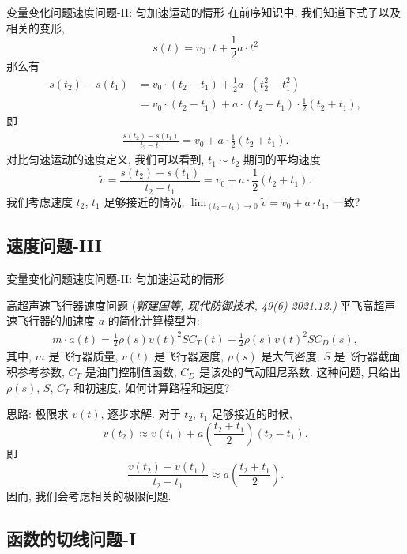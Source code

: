 \documentclass[
10pt,
aspectratio=43,
]{beamer}
\begin{document}
\begin{frame}{变量变化问题}{速度问题-II: 匀加速运动的情形}
	在前序知识中, 我们知道下式子以及相关的变形,
	\[
		s(t) = v_0\cdot t+ \frac{1}{2}a\cdot t^2
	\]
	那么有
	\begin{align*}
		s(t_2) - s(t_1) & = v_0\cdot (t_2-t_1)+ \frac{1}{2}a\cdot (t_2^2-t_1^2)            \\
		                & =v_0\cdot(t_2-t_1) + a\cdot(t_2-t_1) \cdot \frac{1}{2}(t_2+t_1),
	\end{align*}
	即
	\begin{align*}
		\frac{s(t_2) - s(t_1)}{t_2-t_1} = v_0 + a\cdot \frac{1}{2}(t_2+t_1).
	\end{align*}
	对比匀速运动的速度定义, 我们可以看到, $t_1\sim t_2$ 期间的平均速度
	\begin{equation*}
		\tilde{v}=\frac{s(t_2) - s(t_1)}{t_2-t_1} = v_0 + a\cdot \frac{1}{2}(t_2+t_1).
	\end{equation*}
	我们考虑速度 $t_2$, $t_1$ 足够接近的情况, $\lim_{(t_2-t_1)\to 0}\tilde{v}=v_0+a\cdot t_1$, 一致?
\end{frame}

\subsection{速度问题-III} %
\begin{frame}{变量变化问题}{速度问题-II: 匀加速运动的情形}
	\begin{exampleblock}{高超声速飞行器速度问题 \color{blue}(\small{\it 郭建国等, {现代防御技术}, 49(6) 2021.12.)}}
		平飞高超声速飞行器的加速度 $a$ 的简化计算模型为:
		\begin{align*}
			m\cdot a(t)= \frac{1}{2}\rho(s) v(t)^2 S C_T(t) - \frac{1}{2}\rho(s) v(t)^2 S C_D(s),
		\end{align*}
		其中, $m$ 是飞行器质量, $v(t)$ 是飞行器速度, $\rho(s)$ 是大气密度, $S$ 是飞行器截面积参考参数, $C_T$ 是油门控制值函数, $C_D$ 是该处的气动阻尼系数. 这种问题, 只给出$\rho(s)$, $S$, $C_T$ 和初速度, 如何计算路程和速度?
	\end{exampleblock}
	思路: 极限求 $v(t)$, 逐步求解. 对于 $t_2$, $t_1$ 足够接近的时候,
	\[
		v(t_2)\approx v(t_1)+a\left(\frac{t_2+t_1}{2}\right)(t_2-t_1).
	\]
	即
	\[
		\frac{v(t_2)-v(t_1)}{t_2-t_1}\approx a\left(\frac{t_2+t_1}{2}\right).
	\]
	因而, 我们会考虑相关的极限问题.
\end{frame}

\subsection{函数的切线问题-I} %
\end{document}

